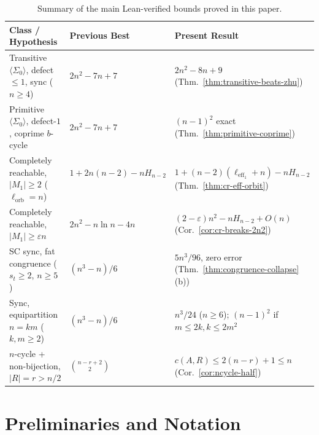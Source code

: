 \documentclass[11pt,a4paper]{article}
\theoremstyle{definition}
\theoremstyle{remark}
\newcommand{\leff}{\ell_{\mathrm{eff}_1}}
\newcommand{\lorb}{\ell_{\mathrm{orb}}}
\begin{document}
\begin{table}[t]
\centering
\footnotesize
\setlength{\tabcolsep}{4pt}
\begin{tabular}{@{}>{\raggedright\arraybackslash}p{4.8cm}>{\raggedright\arraybackslash}p{4.2cm}>{\raggedright\arraybackslash}p{6.2cm}@{}}
\toprule
Class / Hypothesis & Previous Best & Present Result \\
\midrule
Transitive $\langle \Sigma_0 \rangle$, defect $\le 1$, sync ($n \ge 4$) & $2n^2 - 7n + 7$~\cite{Zhu2024} & $2n^2 - 8n + 9$ (Thm.~\ref{thm:transitive-beats-zhu}) \\
Primitive $\langle \Sigma_0 \rangle$, defect-$1$, coprime $b$-cycle & $2n^2 - 7n + 7$~\cite{Zhu2024} & $(n - 1)^2$ exact (Thm.~\ref{thm:primitive-coprime}) \\
Completely reachable, $|M_1| \ge 2$ ($\lorb = n$) & $1 + 2n(n - 2) - n H_{n-2}$~\cite{FS2025} & $1 + (n - 2)(\leff + n) - n H_{n-2}$ (Thm.~\ref{thm:cr-eff-orbit}) \\
Completely reachable, $|M_1| \ge \varepsilon n$ & $2n^2 - n\ln n - 4n$~\cite{FS2025} & $(2 - \varepsilon)n^2 - n H_{n-2} + O(n)$ (Cor.~\ref{cor:cr-breaks-2n2}) \\
SC sync, fat congruence ($s_t \ge 2$, $n \ge 5$) & $(n^3 - n)/6$~\cite{Pin1983} & $5n^3 / 96$, zero error (Thm.~\ref{thm:congruence-collapse}(b)) \\
Sync, equipartition $n = km$ ($k, m \ge 2$) & $(n^3 - n)/6$~\cite{Pin1983} & $n^3 / 24$ ($n \ge 6$); $(n - 1)^2$ if $m \le 2k, k \le 2m^2$ \\
$n$-cycle + non-bijection, $|R| = r > n/2$ & $\binom{n - r + 2}{2}$~\cite{Pin1983} & $c(A, R) \le 2(n - r) + 1 \le n$ (Cor.~\ref{cor:ncycle-half}) \\
\bottomrule
\end{tabular}
\caption{Summary of the main Lean-verified bounds proved in this paper.}
\label{tab:summary}
\end{table}

\section{Preliminaries and Notation}\label{sec:prelim}
\end{document}

